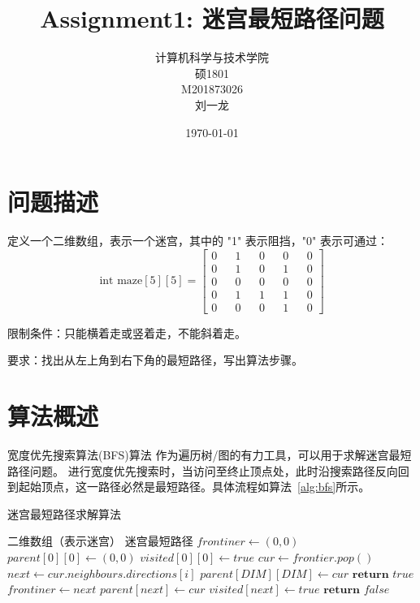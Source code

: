 \documentclass[UTF8,cs4size]{ctexart}
\title{Assignment1: 迷宫最短路径问题}
\author{计算机科学与技术学院\\ 硕1801\\ M201873026\\ 刘一龙}
\date{\today}
\begin{document}
\maketitle
\newpage
\tableofcontents
\newpage
{}

\section{问题描述}
定义一个二维数组，表示一个迷宫，其中的 "1" 表示阻挡，"0" 表示可通过：
\begin{equation*}
  \text{int maze}[5][5] =
  \begin{bmatrix}
    0 && 1 && 0 && 0 && 0 \\
    0 && 1 && 0 && 1 && 0 \\
    0 && 0 && 0 && 0 && 0 \\
    0 && 1 && 1 && 1 && 0 \\
    0 && 0 && 0 && 1 && 0
    \label{eq:maze1}
  \end{bmatrix}
\end{equation*}

限制条件：只能横着走或竖着走，不能斜着走。

要求：找出从左上角到右下角的最短路径，写出算法步骤。
\newpage

\section{算法概述}
宽度优先搜索算法(BFS)算法\cite{wiki:Breadth-first_search} 作为遍历树/图的有力工具，可以用于求解迷宫最短路径问题。
进行宽度优先搜索时，当访问至终止顶点处，此时沿搜索路径反向回到起始顶点，这一路径必然是最短路径。具体流程如算法~\ref{alg:bfs}所示。
\begin{algorithm}
	\renewcommand{\algorithmicrequire}{\textbf{输入:}}
	\renewcommand{\algorithmicensure}{\textbf{输出:}}
	\caption{迷宫最短路径求解算法}
	\label{alg:bfs}
	\begin{algorithmic}[1]
		\REQUIRE 二维数组（表示迷宫）
		\ENSURE 迷宫最短路径
		\STATE $frontiner \leftarrow (0, 0)$
    \STATE $parent[0][0] \leftarrow (0, 0)$
    \STATE $visited[0][0] \leftarrow true$
      \STATE $cur \leftarrow frontier.pop()$
        \STATE $next \leftarrow cur.neighbours.directions[i]$
          \STATE $parent[DIM][DIM] \leftarrow cur$ 
          \STATE $\textbf{return } true$
        \ENDIF
		      \STATE $frontiner \leftarrow next$
          \STATE $parent[next] \leftarrow cur$
		      \STATE $visited[next] \leftarrow true$
        \ENDIF
      \ENDFOR
    \ENDWHILE
    \STATE $\textbf{return } false$
	\end{algorithmic}  
\end{algorithm}
\newpage
\end{document}
